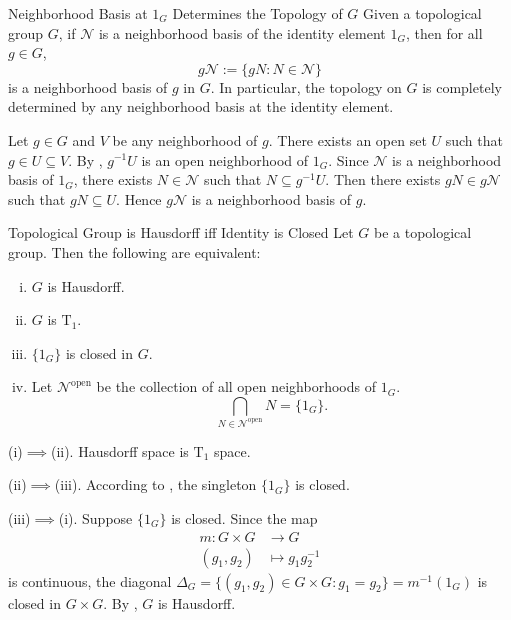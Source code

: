 \documentclass{report}
\begin{document}
\begin{proposition}{Neighborhood Basis at $1_G$ Determines the Topology of $G$}{}
	Given a topological group $G$, if $\mathcal{N}$ is a neighborhood basis of the identity element $1_G$, then for all $g \in G$,
	\[
		g \mathcal{N}:=\{g N: N \in \mathcal{N}\}
	\]
	is a neighborhood basis of $g$ in $G$. In particular, the topology on $G$ is completely determined by any neighborhood basis at the identity element.
\end{proposition}

\begin{prf}
	Let $g\in G$ and $V$ be any neighborhood of $g$. There exists an open set $U$ such that $g\in U\subseteq V$. By , $g^{-1} U$ is an open neighborhood of $1_G$. Since $\mathcal{N}$ is a neighborhood basis of $1_G$, there exists $N \in \mathcal{N}$ such that $N \subseteq g^{-1} U$. Then there exists $g N \in g \mathcal{N}$ such that $g N \subseteq U$. Hence $g \mathcal{N}$ is a neighborhood basis of $g$.
\end{prf}

\begin{proposition}{Topological Group is Hausdorff iff Identity is Closed}{}
	Let $G$ be a topological group. Then the following are equivalent:
	\begin{enumerate}[(i)]
		\item $G$ is Hausdorff.
		\item $G$ is $\mathrm{T}_1$.
		\item $\{1_G\}$ is closed in $G$.
		\item Let $\mathcal{N}^{\mathrm{open}}$ be the collection of all open neighborhoods of $1_G$. 
		\[
		\bigcap\limits_{N \in \mathcal{N}^{\mathrm{open}}} N=\{1_G\}.
		\]
	\end{enumerate}
\end{proposition}
\begin{prf}
	(i)$\implies$(ii). Hausdorff space is $\mathrm{T}_1$ space.

	(ii)$\implies$(iii). According to , the singleton $\{1_G\}$ is closed.
	
	(iii)$\implies$(i). Suppose $\{1_G\}$ is closed. Since the map 
	\begin{align*}
		m:G\times G & \longrightarrow G       \\
		(g_1,g_2)   & \longmapsto g_1g_2^{-1}
	\end{align*}
	is continuous, the diagonal $\Delta_G=\{(g_1,g_2)\in G\times G:g_1=g_2\}=m^{-1}(1_G)$ is closed in $G\times G$. By , $G$ is Hausdorff.
\end{prf}
\end{document}
